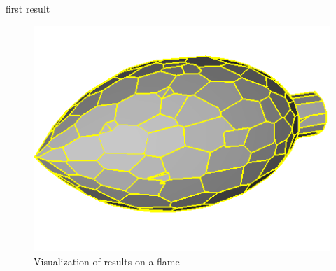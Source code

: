 \documentclass[10pt]{beamer}
\begin{document}
\begin{frame}{first result}
\begin{figure}[H]
\begin{minipage}[t]{0.32\textwidth}
        \includegraphics[width=\textwidth]{../../images/screen_kinetic/flame_inria.png}
        \caption*{inria result}
      \end{minipage}
      \caption{Visualization of results on a flame}
\end{figure}
\end{frame}
\end{document}
